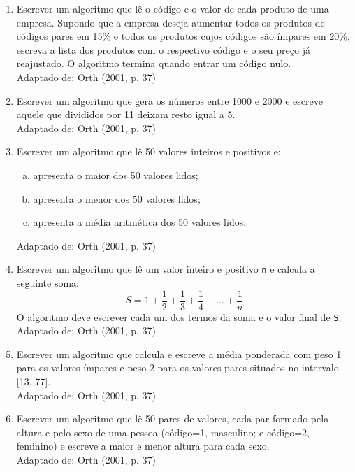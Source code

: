 \documentclass[onecolumn,a4paper,10pt]{report}
\newcommand{\+}{\, + \,}
\newcommand{\<}{\hspace*{-0.4cm}}
\begin{document}
\begin{enumerate}[1.]
\item Escrever um algoritmo que lê o código e o valor de cada produto de uma empresa. Supondo que a empresa deseja aumentar todos os produtos de códigos pares em 15\% e todos os produtos cujos códigos são ímpares em 20\%, escreva a lista dos produtos com o respectivo código e o seu preço já reajustado. O algoritmo termina quando entrar um código nulo.\\
{\tiny Adaptado de: Orth (2001, p. 37)}

\item Escrever um algoritmo que gera os números entre 1000 e 2000 e escreve aquele que divididos por 11 deixam resto igual a 5.\\
{\tiny Adaptado de: Orth (2001, p. 37)}

\item Escrever um algoritmo que lê 50 valores inteiros e positivos e:
\begin{enumerate}[a)]
    \item apresenta o maior dos 50 valores lidos;
    \item apresenta o menor dos 50 valores lidos;
    \item apresenta a média aritmética dos 50 valores lidos.
\end{enumerate}
{\tiny Adaptado de: Orth (2001, p. 37)}

\item Escrever um algoritmo que lê um valor inteiro e positivo \texttt{n} e calcula a seguinte soma:
\[ S = 1 + \frac{1}{2} + \frac{1}{3} + \frac{1}{4} + ... + \frac{1}{n}\]
O algoritmo deve escrever cada um dos termos da soma e o valor final de \texttt{S}.\\
{\tiny Adaptado de: Orth (2001, p. 37)}

\item Escrever um algoritmo que calcula e escreve a média ponderada com peso 1 para os valores ímpares e peso 2 para os valores pares situados no intervalo [13, 77].\\
{\tiny Adaptado de: Orth (2001, p. 37)}

\item Escrever um algoritmo que lê 50 pares de valores, cada par formado pela altura e pelo sexo de uma pessoa (código=1, masculino; e código=2, feminino) e escreve a maior e menor altura para cada sexo.\\
{\tiny Adaptado de: Orth (2001, p. 37)}


\end{enumerate}
\end{document}
